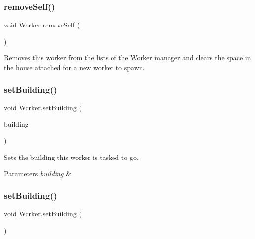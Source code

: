 \subsubsection{\texorpdfstring{remove\+Self()}{removeSelf()}}
{\footnotesize\ttfamily void Worker.\+remove\+Self (\begin{DoxyParamCaption}{ }\end{DoxyParamCaption})}



Removes this worker from the lists of the \mbox{\hyperlink{class_worker}{Worker}} manager and clears the space in the house attached for a new worker to spawn. 

\mbox{\label{class_worker_afe55750c4fb5679683417e717f3aa399}} 
\subsubsection{\texorpdfstring{set\+Building()}{setBuilding()}\hspace{0.1cm}{\footnotesize\ttfamily [1/2]}}
{\footnotesize\ttfamily void Worker.\+set\+Building (\begin{DoxyParamCaption}\item[{Game\+Object}]{building }\end{DoxyParamCaption})}



Sets the building this worker is tasked to go. 


\begin{DoxyParams}{Parameters}
{\em building} & \\
\hline
\end{DoxyParams}
\mbox{\label{class_worker_ae7adec62661e7e34f7fa2a482ead0ff3}} 
\subsubsection{\texorpdfstring{set\+Building()}{setBuilding()}\hspace{0.1cm}{\footnotesize\ttfamily [2/2]}}
{\footnotesize\ttfamily void Worker.\+set\+Building (\begin{DoxyParamCaption}{ }\end{DoxyParamCaption})}



